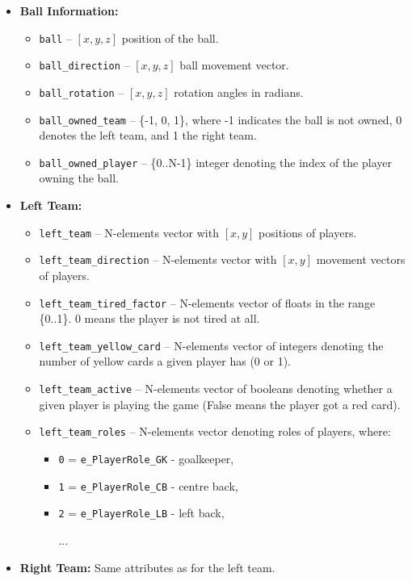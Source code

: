 \begin{itemize}[leftmargin=*]
\item \textbf{Ball Information:}
\begin{itemize}
\item \texttt{ball} -- $[x, y, z]$ position of the ball.
\item \texttt{ball\_direction} -- $[x, y, z]$ ball movement vector.
\item \texttt{ball\_rotation} -- $[x, y, z]$ rotation angles in radians.
\item \texttt{ball\_owned\_team} -- \{-1, 0, 1\}, where -1 indicates the ball is not owned, 0 denotes the left team, and 1 the right team.
\item \texttt{ball\_owned\_player} -- \{0..N-1\} integer denoting the index of the player owning the ball.
\end{itemize}

\item \textbf{Left Team:}
\begin{itemize}
\item \texttt{left\_team} -- N-elements vector with $[x, y]$ positions of players.
\item \texttt{left\_team\_direction} -- N-elements vector with $[x, y]$ movement vectors of players.
\item \texttt{left\_team\_tired\_factor} -- N-elements vector of floats in the range \{0..1\}. 0 means the player is not tired at all.
\item \texttt{left\_team\_yellow\_card} -- N-elements vector of integers denoting the number of yellow cards a given player has (0 or 1).
\item \texttt{left\_team\_active} -- N-elements vector of booleans denoting whether a given player is playing the game (False means the player got a red card).
\item \texttt{left\_team\_roles} -- N-elements vector denoting roles of players, where:
\begin{itemize}
\item \texttt{0} = \texttt{e\_PlayerRole\_GK} - goalkeeper,
\item \texttt{1} = \texttt{e\_PlayerRole\_CB} - centre back,
\item \texttt{2} = \texttt{e\_PlayerRole\_LB} - left back,
\item [...]
\end{itemize}
\end{itemize}

\item \textbf{Right Team:} Same attributes as for the left team.


\end{itemize}
